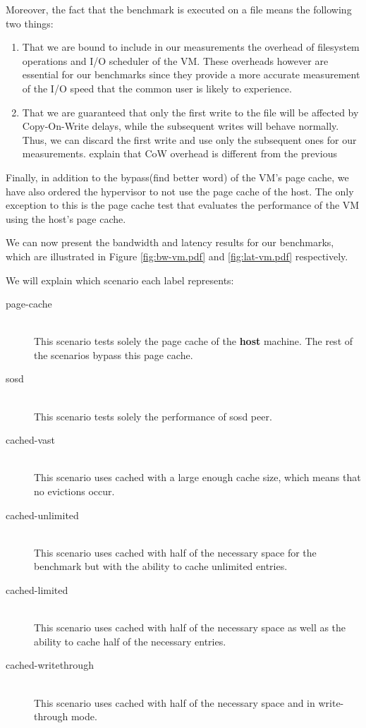 Moreover, the fact that the benchmark is executed on a file means the following 
two things:

\begin{enumerate}
	\item That we are bound to include in our measurements the overhead of 
		filesystem operations and I/O scheduler of the VM. These overheads 
		however are essential for our benchmarks since they provide a more 
		accurate measurement of the I/O speed that the common user is likely to 
		experience.
	\item That we are guaranteed that only the first write to the file will be 
		affected by Copy-On-Write delays, while the subsequent writes will 
		behave normally.  Thus, we can discard the first write and use only
		the subsequent ones for our measurements. \fixme explain that CoW 
		overhead is different from the previous
\end{enumerate}

Finally, in addition to the bypass(\fixme find better word) of the VM's page 
cache, we have also ordered the hypervisor to not use the page cache of the 
host. The only exception to this is the page cache test that evaluates the 
performance of the VM using the host's page cache.

We can now present the bandwidth and latency results for our benchmarks, which 
are illustrated in Figure \ref{fig:bw-vm.pdf} and \ref{fig:lat-vm.pdf} 
respectively. 



We will explain which scenario each label represents:

\begin{description}
	\item[page-cache] \hfill \\
		This scenario tests solely the page cache of the \textbf{host} machine.  
		The rest of the scenarios bypass this page cache.
	\item[sosd] \hfill \\
		This scenario tests solely the performance of sosd peer.
	\item[cached-vast] \hfill \\
		This scenario uses cached with a large enough cache size, which means 
		that no evictions occur.
	\item[cached-unlimited] \hfill \\
		This scenario uses cached with half of the necessary space for the 
		benchmark but with the ability to cache unlimited entries.
	\item[cached-limited] \hfill \\
		This scenario uses cached with half of the necessary space as well as 
		the ability to cache half of the necessary entries.
	\item[cached-writethrough] \hfill \\
		This scenario uses cached with half of the necessary space and in 
		write-through mode.
\end{description}

